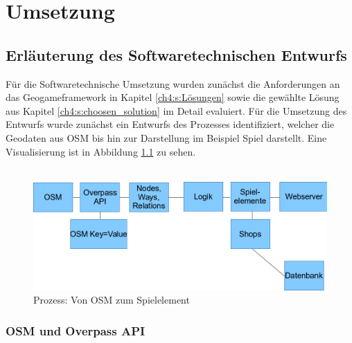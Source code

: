 \chapter{Umsetzung}
\label{ch:S5_Umsetzung}

\section{Erläuterung des Softwaretechnischen Entwurfs}
\label{ch5:s:Entwurf}

Für die Softwaretechnische Umsetzung wurden zunächst die Anforderungen an das Geogameframework in Kapitel \ref{ch4:s:Lösungen} sowie die gewählte Lösung aus Kapitel \ref{ch4:s:choosen_solution} im Detail evaluiert. Für die Umsetzung des Entwurfs wurde zunächst ein Entwurfs des Prozesses identifiziert, welcher die Geodaten aus OSM bis hin zur Darstellung im Beispiel Spiel darstellt. Eine Visualisierung ist in Abbildung \ref{img:ch5_img01_framework_progress} zu sehen.
\\\\

\begin{figure}[H]
\begin{center}
\includegraphics[width=140mm]{images/ch5_img01_framework_progress.png}
\caption{Prozess: Von OSM zum Spielelement}
\label{img:ch5_img01_framework_progress}
\end{center}
\end{figure}

\subsection*{OSM und Overpass API}

